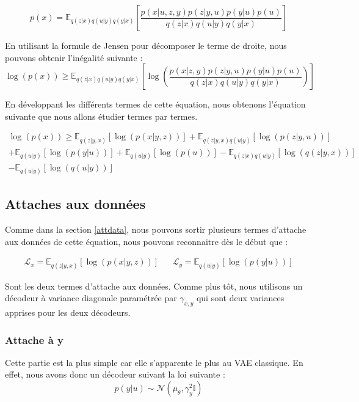 \documentclass{article}
\begin{document}
\begin{equation*}
    p(x) = \mathbb{E}_{q(z|x)q(u|y)q(y|x)}\left[\frac{p(x|u,z,y)p(z|y,u)p(y|u)p(u)}{q(z|x)q(u|y)q(y|x)}\right]
\end{equation*}

En utilisant la formule de Jensen pour décomposer le terme de droite, nous pouvons obtenir l'inégalité suivante :
\begin{equation*}
    \log(p(x)) \geq \mathbb{E}_{q(z|x)q(u|y)q(y|x)}\left[\log\left(\frac{p(x|z,y)p(z|y,u)p(y|u)p(u)}{q(z|x)q(u|y)q(y|x)}\right)\right]
\end{equation*}

En développant les différents termes de cette équation, nous obtenons l'équation suivante que nous allons étudier termes par termes.

\begin{multline}
    \log(p(x)) \geq \mathbb{E}_{q(z|y,x)}\left[\log(p(x|y,z))\right] + \mathbb{E}_{q(z|y,x)q(u|y)}\left[\log(p(z|y,u))\right] \\+ \mathbb{E}_{q(u|y)}\left[\log(p(y|u))\right] + \mathbb{E}_{q(u|y)}\left[\log(p(u))\right] - \mathbb{E}_{q(z|x)q(u|y)}\left[\log(q(z|y,x))\right]\\ - \mathbb{E}_{q(u|y)}\left[\log(q(u|y))\right]
\end{multline}

\subsection{Attaches aux données}

Comme dans la section \ref{attdata}, nous pouvons sortir plusieurs termes d'attache aux données de cette équation, nous pouvons reconnaitre dès le début que :

\begin{align*}
    \mathcal{L}_x = \mathbb{E}_{q(z|y,x)}\left[\log(p(x|y,z))\right] && \mathcal{L}_y =\mathbb{E}_{q(u|y)}\left[\log(p(y|u))\right]
\end{align*}

Sont les deux termes d'attache aux données. Comme plus tôt, nous utilisons un décodeur à variance diagonale paramétrée par $\gamma_{x,y}$ qui sont deux variances apprises pour les deux décodeurs.

\subsubsection{Attache à y}

Cette partie est la plus simple car elle s'apparente le plus au VAE classique. En effet, nous avons donc un décodeur suivant la loi suivante :
\begin{equation}
    p(y|u) \sim \mathcal{N}(\mu_\theta, \gamma_y^2\mathbb{I})
\end{equation}
\end{document}
